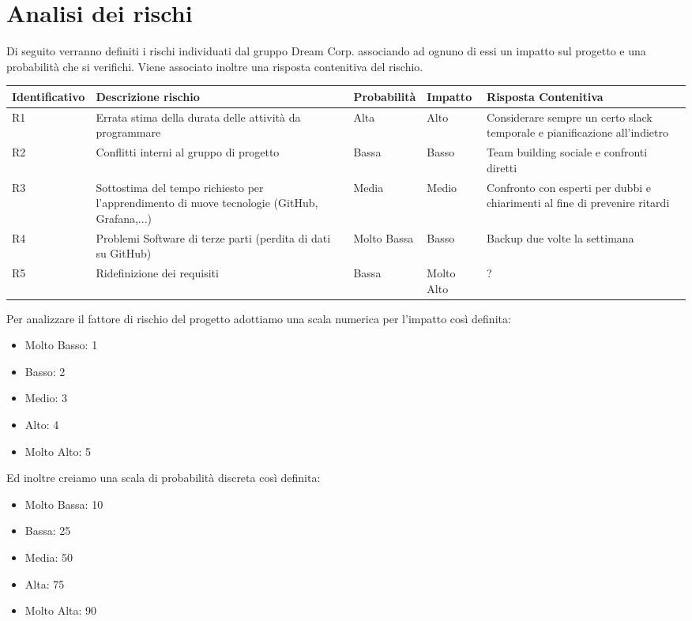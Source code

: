 \section{Analisi dei rischi}

	Di seguito verranno definiti i rischi individuati dal gruppo Dream Corp. associando ad ognuno di essi un impatto sul progetto e una probabilità che si verifichi. Viene associato inoltre una risposta contenitiva del rischio. 
	\newline \newline
	\begin{tabularx}{\textwidth}{|X|X|X|X|X|}
		\hline
		\textbf{Identificativo} & \textbf{Descrizione rischio} & \textbf{Probabilità} & \textbf{Impatto} & \textbf{Risposta Contenitiva}\\
		\hline
		R1 & Errata stima della durata delle attività da programmare & Alta & Alto & Considerare sempre un certo slack temporale e pianificazione all’indietro\\
		\hline
		R2 & Conflitti interni al gruppo di progetto & Bassa & Basso & Team building sociale e confronti diretti\\
		\hline
		R3 & Sottostima del tempo richiesto per l’apprendimento di nuove tecnologie (GitHub, Grafana,...) & Media & Medio & Confronto con esperti per dubbi e chiarimenti al fine di prevenire ritardi\\
		\hline
		R4 & Problemi Software di terze parti (perdita di dati su GitHub) & Molto  Bassa & Basso &  Backup due volte la settimana\\
		\hline
		R5 & Ridefinizione dei requisiti & Bassa & Molto Alto & ?\\
		\hline
	\end{tabularx}
	\newline 
	 \newline
	 \newline
	Per analizzare il fattore di rischio del progetto adottiamo una scala numerica per l’impatto così definita:
	\begin{itemize}
		\item Molto Basso: 1
		\item Basso: 2
		\item Medio: 3
		\item Alto: 4
		\item Molto Alto: 5
	\end{itemize}
	Ed inoltre creiamo una scala di probabilità discreta così definita:
	\begin{itemize}
		\item Molto Bassa: 10%
		\item Bassa: 25%
		\item Media: 50%
		\item Alta: 75%
		\item Molto Alta: 90%
	\end{itemize}
